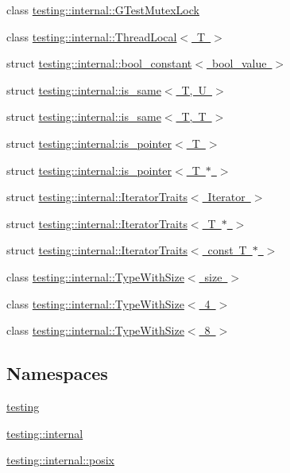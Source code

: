 \begin{DoxyCompactItemize}
class \mbox{\hyperlink{classtesting_1_1internal_1_1GTestMutexLock}{testing\+::internal\+::\+G\+Test\+Mutex\+Lock}}
\item 
class \mbox{\hyperlink{classtesting_1_1internal_1_1ThreadLocal}{testing\+::internal\+::\+Thread\+Local$<$ T $>$}}
\item 
struct \mbox{\hyperlink{structtesting_1_1internal_1_1bool__constant}{testing\+::internal\+::bool\+\_\+constant$<$ bool\+\_\+value $>$}}
\item 
struct \mbox{\hyperlink{structtesting_1_1internal_1_1is__same}{testing\+::internal\+::is\+\_\+same$<$ T, U $>$}}
\item 
struct \mbox{\hyperlink{structtesting_1_1internal_1_1is__same_3_01T_00_01T_01_4}{testing\+::internal\+::is\+\_\+same$<$ T, T $>$}}
\item 
struct \mbox{\hyperlink{structtesting_1_1internal_1_1is__pointer}{testing\+::internal\+::is\+\_\+pointer$<$ T $>$}}
\item 
struct \mbox{\hyperlink{structtesting_1_1internal_1_1is__pointer_3_01T_01_5_01_4}{testing\+::internal\+::is\+\_\+pointer$<$ T $\ast$ $>$}}
\item 
struct \mbox{\hyperlink{structtesting_1_1internal_1_1IteratorTraits}{testing\+::internal\+::\+Iterator\+Traits$<$ Iterator $>$}}
\item 
struct \mbox{\hyperlink{structtesting_1_1internal_1_1IteratorTraits_3_01T_01_5_01_4}{testing\+::internal\+::\+Iterator\+Traits$<$ T $\ast$ $>$}}
\item 
struct \mbox{\hyperlink{structtesting_1_1internal_1_1IteratorTraits_3_01const_01T_01_5_01_4}{testing\+::internal\+::\+Iterator\+Traits$<$ const T $\ast$ $>$}}
\item 
class \mbox{\hyperlink{classtesting_1_1internal_1_1TypeWithSize}{testing\+::internal\+::\+Type\+With\+Size$<$ size $>$}}
\item 
class \mbox{\hyperlink{classtesting_1_1internal_1_1TypeWithSize_3_014_01_4}{testing\+::internal\+::\+Type\+With\+Size$<$ 4 $>$}}
\item 
class \mbox{\hyperlink{classtesting_1_1internal_1_1TypeWithSize_3_018_01_4}{testing\+::internal\+::\+Type\+With\+Size$<$ 8 $>$}}
\end{DoxyCompactItemize}
\subsection*{Namespaces}
\begin{DoxyCompactItemize}
\item 
 \mbox{\hyperlink{namespacetesting}{testing}}
\item 
 \mbox{\hyperlink{namespacetesting_1_1internal}{testing\+::internal}}
\item 
 \mbox{\hyperlink{namespacetesting_1_1internal_1_1posix}{testing\+::internal\+::posix}}
\end{DoxyCompactItemize}
